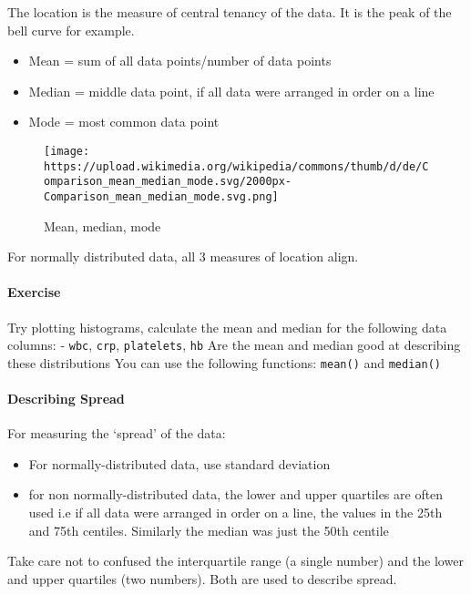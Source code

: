 \documentclass[
]{article}
\providecommand{\tightlist}{%
  \setlength{\itemsep}{0pt}\setlength{\parskip}{0pt}}
\begin{document}
The location is the measure of central tenancy of the data. It is the
peak of the bell curve for example.

\begin{itemize}
\tightlist
\item
  Mean = sum of all data points/number of data points
\item
  Median = middle data point, if all data were arranged in order on a
  line
\item
  Mode = most common data point
\end{itemize}

\begin{figure}
\centering
\texttt{[image: https://upload.wikimedia.org/wikipedia/commons/thumb/d/de/Comparison\_mean\_median\_mode.svg/2000px-Comparison\_mean\_median\_mode.svg.png]}
\caption{Mean, median, mode}
\end{figure}

For normally distributed data, all 3 measures of location align.

\hypertarget{exercise}{%
\paragraph{Exercise}\label{exercise}}

Try plotting histograms, calculate the mean and median for the following
data columns: - \texttt{wbc}, \texttt{crp}, \texttt{platelets},
\texttt{hb} Are the mean and median good at describing these
distributions You can use the following functions: \texttt{mean()} and
\texttt{median()}

\hypertarget{describing-spread}{%
\paragraph{Describing Spread}\label{describing-spread}}

For measuring the `spread' of the data:

\begin{itemize}
\tightlist
\item
  For normally-distributed data, use standard deviation
\item
  for non normally-distributed data, the lower and upper quartiles are
  often used i.e if all data were arranged in order on a line, the
  values in the 25th and 75th centiles. Similarly the median was just
  the 50th centile
\end{itemize}

Take care not to confused the interquartile range (a single number) and
the lower and upper quartiles (two numbers). Both are used to describe
spread.
\end{document}
